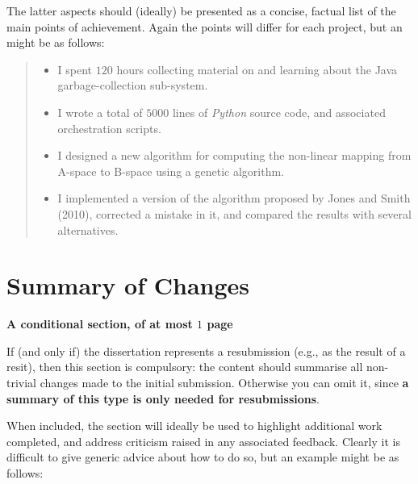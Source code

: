 \documentclass[ %
                    author={Daniel Page},
                supervisor={Dr. Andrew Calway},
                    degree={MSc},
                     title={Some Structural Guidelines for Data Science MSc Theses, Including Those With Long Titles that Run Across Multiple Lines on the Front Page},
                  subtitle={And those including an optional subtitle too, for good measure},
                      type={},
                      year={2021}]{dissertation}
\begin{document}
\noindent
The latter aspects should (ideally) be presented as a concise, factual 
list of the main points of achievement.  Again the points will differ for each project, but 
an might be as follows:

\begin{quote}
\noindent
\begin{itemize}
\item I spent $120$ hours collecting material on and learning about the 
      Java garbage-collection sub-system. 
\item I wrote a total of $5000$ lines of {\em Python} source code, and associated orchestration scripts. 
\item I designed a new algorithm for computing the non-linear mapping 
      from A-space to B-space using a genetic algorithm.
\item I implemented a version of the algorithm proposed by Jones and 
      Smith (2010), corrected a mistake in it, and 
      compared the results with several alternatives.
\end{itemize}
\end{quote}


\chapter*{Summary of Changes}

{\bf A conditional section, of at most $1$ page} 
\vspace{1cm} 

If (and only if) the dissertation represents a resubmission (e.g., as the result of
a resit), then this section is compulsory: the content should summarise all
non-trivial changes made to the initial submission.  Otherwise you can
omit it, since {\bf a summary of this type is only needed for resubmissions}.

When included, the section will ideally be used to highlight additional
work completed, and address criticism raised in any associated feedback.
Clearly it is difficult to give generic advice about how to do so, but
an example might be as follows:
\end{document}
